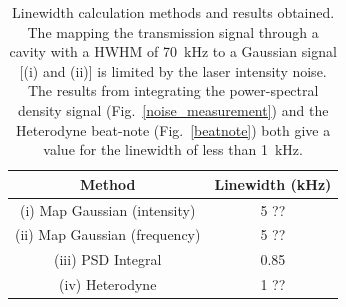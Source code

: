 \documentclass[10pt,letterpaper]{article}
\begin{document}
\begin{table}[h!]
\centering
\begin{tabular}{|c|c|}
\hline \hline
Method & Linewidth (kHz) \\ \hline
(i) Map Gaussian (intensity) & 5 ?? \\
(ii) Map Gaussian (frequency) & 5 ?? \\
(iii) PSD Integral & 0.85 \\
(iv) Heterodyne & 1 ?? \\
\hline \hline
\end{tabular}
\caption{Linewidth calculation methods and results obtained. The mapping the transmission signal through a cavity with a HWHM of 70~kHz to a Gaussian signal [(i) and (ii)] is limited by the laser intensity noise. The results from integrating the power-spectral density signal (Fig.~\ref{noise_measurement}) and the Heterodyne beat-note (Fig.~\ref{beatnote}) both give a value for the linewidth of less than 1~kHz.}
\label{linewidth_table}
\end{table}

\end{document}
